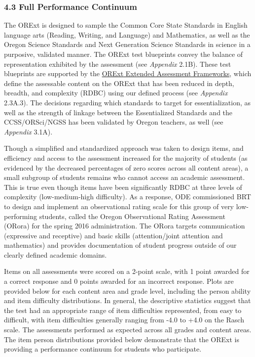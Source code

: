 \documentclass[]{article}
\begin{document}
\subsubsection{4.3 Full Performance
Continuum}\label{full-performance-continuum}

The ORExt is designed to sample the Common Core State Standards in
English language arts (Reading, Writing, and Language) and Mathematics,
as well as the Oregon Science Standards and Next Generation Science
Standards in science in a purposive, validated manner. The ORExt test
blueprints convey the balance of representation exhibited by the
assessment (see \emph{Appendix} 2.1B). These test blueprints are
supported by the
\color{link}\href{http://www.brtprojects.org/publications/training-modules}{ORExt
Extended Assessment Frameworks}\color{black}, which define the
assessable content on the ORExt that has been reduced in depth, breadth,
and complexity (RDBC) using our defined process (see \emph{Appendix}
2.3A.3). The decisions regarding which standards to target for
essentialization, as well as the strength of linkage between the
Essentialized Standards and the CCSS/ORSci/NGSS has been validated by
Oregon teachers, as well (see \emph{Appendix} 3.1A).

Though a simplified and standardized approach was taken to design items,
and efficiency and access to the assessment increased for the majority
of students (as evidenced by the decreased percentages of zero scores
across all content areas), a small subgroup of students remains who
cannot access an academic assessment. This is true even though items
have been significantly RDBC at three levels of complexity
(low-medium-high difficulty). As a response, ODE commissioned BRT to
design and implement an observational rating scale for this group of
very low-performing students, called the Oregon Observational Rating
Assessment (ORora) for the spring 2016 administration. The ORora targets
communication (expressive and receptive) and basic skills
(attention/joint attention and mathematics) and provides documentation
of student progress outside of our clearly defined academic domains.

Items on all assessments were scored on a 2-point scale, with 1 point
awarded for a correct response and 0 points awarded for an incorrect
response. Plots are provided below for each content area and grade
level, including the person ability and item difficulty distributions.
In general, the descriptive statistics suggest that the test had an
appropriate range of item difficulties represented, from easy to
difficult, with item difficulties generally ranging from -4.0 to +4.0 on
the Rasch scale. The assessments performed as expected across all grades
and content areas. The item person distributions provided below
demonstrate that the ORExt is providing a performance continuum for
students who participate.
\end{document}
